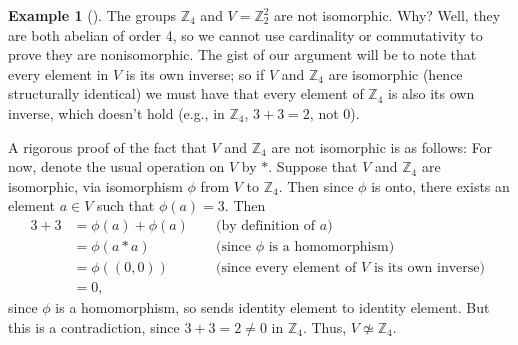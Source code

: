 \documentclass[10pt,openany,oneside]{book}
\theoremstyle{plain}
\theoremstyle{definition}
\theoremstyle{definition}
\theoremstyle{definition}
\newtheorem{example}[theorem]{Example}
\theoremstyle{definition}
\numberwithin{equation}{section}
\def\Z{\mathbb{Z}}
\newcommand{\amp}{&}
\begin{document}
\begin{example}[]\label{x4nonunique}
The groups \(\Z_4\) and \(V=\Z_2^2\) are not isomorphic. Why? Well, they are both abelian of order 4, so we cannot use cardinality or commutativity to prove they are nonisomorphic. The gist of our argument will be to note that every element in \(V\) is its own inverse; so if \(V\) and \(\Z_4\) are isomorphic (hence structurally identical) we must have that every element of \(\Z_4\) is also its own inverse, which doesn't hold (e.g., in \(\Z_4\), \(3+3=2\), not \(0\)).%
\par
A rigorous proof of the fact that \(V\) and \(\Z_4\) are not isomorphic is as follows: For now, denote the usual operation on \(V\) by \(*\). Suppose that \(V\) and \(\Z_4\) are isomorphic, via isomorphism \(\phi\) from \(V\) to \(\Z_4\). Then since \(\phi\) is onto, there exists an element \(a\in V\) such that \(\phi(a)=3\). Then%
\begin{align*}
3+3\amp =\phi(a)+\phi(a)\amp \amp \text{ (by definition of \(a\)) }\\
\amp =\phi(a*a) \amp \amp \text{ (since \(\phi\) is a homomorphism) }\\
\amp =\phi((0,0)) \amp \amp \text{ (since every element of \(V\) is its own inverse) }\\
\amp =0, \amp \amp
\end{align*}
since \(\phi\) is a homomorphism, so sends identity element to identity element. But this is a contradiction, since \(3+3=2\neq 0\) in \(\Z_4\). Thus, \(V\not\simeq \Z_4\).%
\end{example}
\typeout{************************************************}
\typeout{************************************************}
\end{document}
